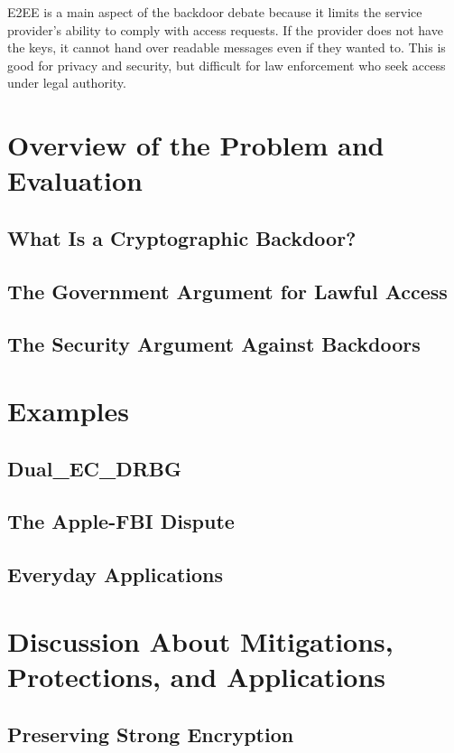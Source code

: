 \documentclass{easychair}
\begin{document}
E2EE is a main aspect of the backdoor debate because it limits the service provider's ability to comply with access requests. If the provider does not have the keys, it cannot hand over readable messages even if they wanted to. This is good for privacy and security, but difficult for law enforcement who seek access under legal authority.

\section{Overview of the Problem and Evaluation}

\subsection{What Is a Cryptographic Backdoor?}


\subsection{The Government Argument for Lawful Access}


\subsection{The Security Argument Against Backdoors}


\section{Examples}

\subsection{Dual\_EC\_DRBG}


\subsection{The Apple-FBI Dispute}


\subsection{Everyday Applications}


\section{Discussion About Mitigations, Protections, and Applications}

\subsection{Preserving Strong Encryption}
\end{document}
